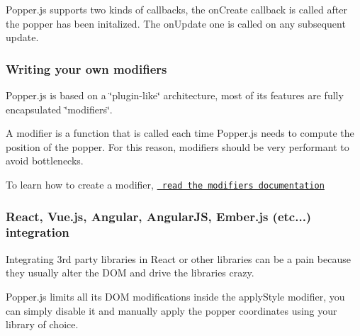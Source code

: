 Popper.\+js supports two kinds of callbacks, the {\ttfamily on\+Create} callback is called after the popper has been initalized. The {\ttfamily on\+Update} one is called on any subsequent update.


\begin{DoxyCode}{0}
\DoxyCodeLine{    \},}
\DoxyCodeLine{    \}}
\DoxyCodeLine{\});}
\end{DoxyCode}


\subsubsection*{Writing your own modifiers}

Popper.\+js is based on a \char`\"{}plugin-\/like\char`\"{} architecture, most of its features are fully encapsulated \char`\"{}modifiers\char`\"{}.

A modifier is a function that is called each time Popper.\+js needs to compute the position of the popper. For this reason, modifiers should be very performant to avoid bottlenecks.

To learn how to create a modifier, \href{docs/_includes/popper-documentation.md\#modifiers--object}{\texttt{ read the modifiers documentation}}

\subsubsection*{React, Vue.\+js, Angular, Angular\+JS, Ember.\+js (etc...) integration}

Integrating 3rd party libraries in React or other libraries can be a pain because they usually alter the D\+OM and drive the libraries crazy.

Popper.\+js limits all its D\+OM modifications inside the {\ttfamily apply\+Style} modifier, you can simply disable it and manually apply the popper coordinates using your library of choice.

